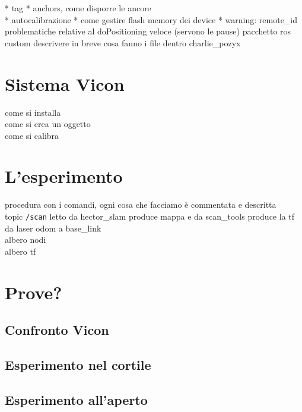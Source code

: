 * tag
* anchors, come disporre le ancore \\
* autocalibrazione
* come gestire flash memory dei device
* warning: remote\_id 
		problematiche relative al doPositioning veloce (servono le pause)
		pacchetto ros custom descrivere in breve cosa fanno i file dentro charlie\_pozyx

\section{Sistema Vicon}
\label{sez:Sistema Vicon}
come si installa \\
come si crea un oggetto\\
come si calibra

\section{L'esperimento}
\label{sez:L'esperimento}
procedura con i comandi, ogni cosa che facciamo \`e commentata e descritta \\
topic \texttt{/scan} letto da hector\_slam produce mappa e da scan\_tools produce la tf da laser odom a base\_link \\
albero nodi\\
albero tf\\

\section{Prove?}
\subsection{Confronto Vicon}

\subsection{Esperimento nel cortile}

\subsection{Esperimento all'aperto}



